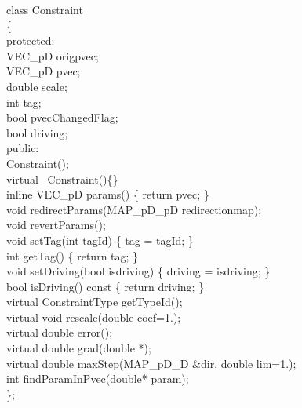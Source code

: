 \documentclass[12pt,twoside,a4paper]{book}
\begin{document}
    \begin{codequote}
    class Constraint\\
    \{\\
    protected:\\
    \-\hspace{0.5cm}VEC\_pD origpvec; \\
    \-\hspace{0.5cm}VEC\_pD pvec; \\
    \-\hspace{0.5cm}double scale; \\
    \-\hspace{0.5cm}int tag; \\
    \-\hspace{0.5cm}bool pvecChangedFlag; \\
    \-\hspace{0.5cm}bool driving; \\
    public: \\
    \-\hspace{0.5cm}Constraint(); \\
    \-\hspace{0.5cm}virtual ~Constraint()\{\} \\

    \-\hspace{0.5cm}inline VEC\_pD params() \{ return pvec; \}\\

    \-\hspace{0.5cm}void redirectParams(MAP\_pD\_pD redirectionmap);\\
    \-\hspace{0.5cm}void revertParams();\\
    \-\hspace{0.5cm}void setTag(int tagId) \{ tag = tagId; \}\\
    \-\hspace{0.5cm}int getTag() \{ return tag; \}\\

    \-\hspace{0.5cm}void setDriving(bool isdriving) \{ driving = isdriving; \}\\
    \-\hspace{0.5cm}bool isDriving() const \{ return driving; \}\\

    \-\hspace{0.5cm}virtual ConstraintType getTypeId(); \\
    \-\hspace{0.5cm}virtual void rescale(double coef=1.); \\
    \-\hspace{0.5cm}virtual double error(); \\
    \-\hspace{0.5cm}virtual double grad(double *); \\
    \-\hspace{0.5cm}virtual double maxStep(MAP\_pD\_D \&dir, double lim=1.); \\
    \-\hspace{0.5cm}int findParamInPvec(double* param); \\
    \};
    \end{codequote}
\end{document}

